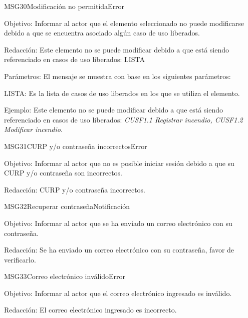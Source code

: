 \begin{mensaje}{MSG30}{Modificación no permitida}{Error}
    \item[Objetivo:] Informar al actor que el elemento seleccionado no puede modificarse debido a que se encuentra asociado algún caso de uso liberados.
    \item[Redacción:] Este elemento no se puede modificar debido a que está siendo referenciado en casos de uso liberados: LISTA
    \item[Parámetros:] El mensaje se muestra con base en los siguientes parámetros:
    \begin{Citemize}
	\item LISTA: Es la lista de casos de uso liberados en los que se utiliza el elemento.
    \end{Citemize}
    \item[Ejemplo:] Este elemento no se puede modificar debido a que está siendo referenciado en casos de uso liberados: {\em CUSF1.1 Registrar incendio, CUSF1.2 Modificar incendio}.
\end{mensaje}
\begin{mensaje}{MSG31}{CURP y/o contraseña incorrectos}{Error}
    \item[Objetivo:] Informar al actor que no es posible iniciar sesión debido a que su CURP y/o contraseña son incorrectos.
    \item[Redacción:] CURP y/o contraseña incorrectos.
\end{mensaje}

\begin{mensaje}{MSG32}{Recuperar contraseña}{Notificación}
    \item[Objetivo:] Informar al actor que se ha enviado un correo electrónico con su contraseña.
    \item[Redacción:] Se ha enviado un correo electrónico con su contraseña, favor de verificarlo.
\end{mensaje}
\begin{mensaje}{MSG33}{Correo electrónico inválido}{Error}
    \item[Objetivo:] Informar al actor que el correo electrónico ingresado es inválido.
    \item[Redacción:] El correo electrónico ingresado es incorrecto.
\end{mensaje}


